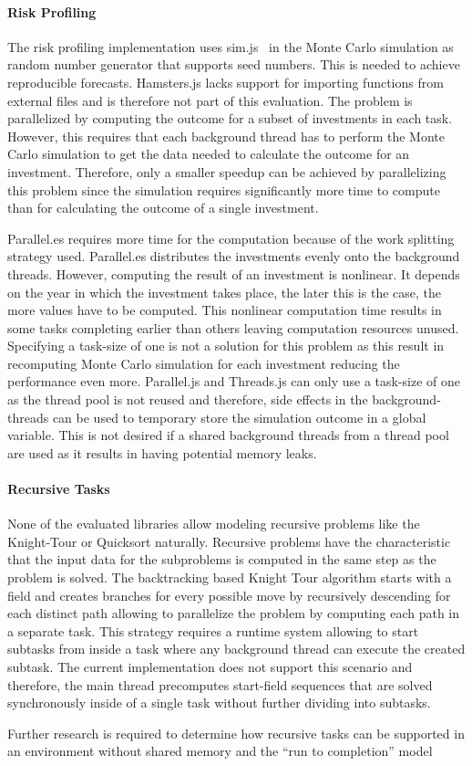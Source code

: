 \paragraph{Risk Profiling}
The risk profiling implementation uses sim.js~\cite{simjs} in the Monte Carlo simulation as random number generator that supports seed numbers. This is needed to achieve reproducible forecasts. Hamsters.js lacks support for importing functions from external files and is therefore not part of this evaluation. The problem is parallelized by computing the outcome for a subset of investments in each task. However, this requires that each background thread has to perform the Monte Carlo simulation to get the data needed to calculate the outcome for an investment. Therefore, only a smaller speedup can be achieved by parallelizing this problem since the simulation requires significantly more time to compute than for calculating the outcome of a single investment. 

Parallel.es requires more time for the computation because of the work splitting strategy used. Parallel.es distributes the investments evenly onto the background threads. However, computing the result of an investment is nonlinear. It depends on the year in which the investment takes place, the later this is the case, the more values have to be computed. This nonlinear computation time results in some tasks completing earlier than others leaving computation resources unused. Specifying a task-size of one is not a solution for this problem as this result in recomputing Monte Carlo simulation for each investment reducing the performance even more. Parallel.js and Threads.js can only use a task-size of one as the thread pool is not reused and therefore, side effects in the background-threads can be used to temporary store the simulation outcome in a global variable. This is not desired if a shared background threads from a thread pool are used as it results in having potential memory leaks.

\paragraph{Recursive Tasks} 

None of the evaluated libraries allow modeling recursive problems like the Knight-Tour or Quicksort naturally. Recursive problems have the characteristic that the input data for the subproblems is computed in the same step as the problem is solved. The backtracking based Knight Tour algorithm starts with a field and creates branches for every possible move by recursively descending for each distinct path allowing to parallelize the problem by computing each path in a separate task.  This strategy requires a runtime system allowing to start subtasks from inside a task where any background thread can execute the created subtask. The current implementation does not support this scenario and therefore, the main thread precomputes start-field sequences that are solved synchronously inside of a single task without further dividing into subtasks.

Further research is required to determine how recursive tasks can be supported in an environment without shared memory and the \enquote{run to completion} model